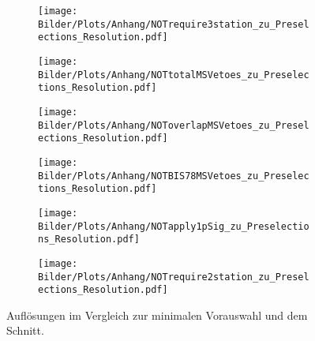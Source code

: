 \begin{figure}
  \begin{subfigure}[t]{0.5\textwidth}
  \texttt{[image: Bilder/Plots/Anhang/NOTrequire3station\_zu\_Preselections\_Resolution.pdf]}
  \end{subfigure}
\begin{subfigure}[t]{0.5\textwidth}
 \texttt{[image: Bilder/Plots/Anhang/NOTtotalMSVetoes\_zu\_Preselections\_Resolution.pdf]}
\end{subfigure}
\begin{subfigure}[t]{0.5\textwidth}
  \texttt{[image: Bilder/Plots/Anhang/NOToverlapMSVetoes\_zu\_Preselections\_Resolution.pdf]}
\end{subfigure}
\begin{subfigure}[t]{0.5\textwidth}
  \texttt{[image: Bilder/Plots/Anhang/NOTBIS78MSVetoes\_zu\_Preselections\_Resolution.pdf]}
\end{subfigure}
\begin{subfigure}[t]{0.5\textwidth}
  \texttt{[image: Bilder/Plots/Anhang/NOTapply1pSig\_zu\_Preselections\_Resolution.pdf]}
\end{subfigure}
\begin{subfigure}[t]{0.5\textwidth}
  \texttt{[image: Bilder/Plots/Anhang/NOTrequire2station\_zu\_Preselections\_Resolution.pdf]}
\end{subfigure}
\caption{Auflösungen im Vergleich zur minimalen Vorauswahl und dem Schnitt.}
\end{figure}
